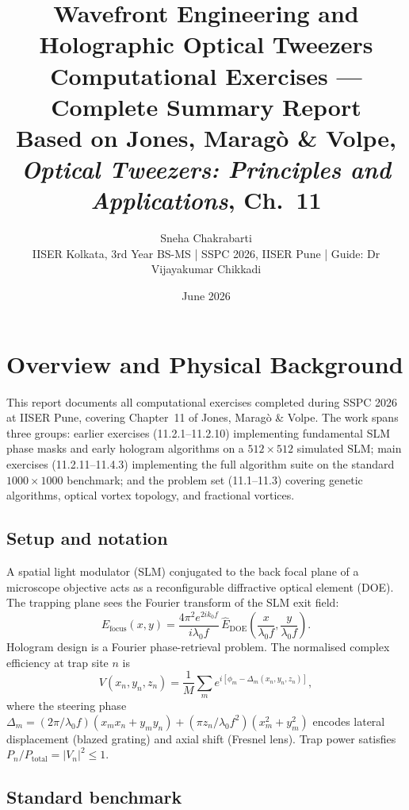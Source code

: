 \documentclass[11pt,a4paper]{article}
\title{\textbf{Wavefront Engineering and Holographic Optical Tweezers}\\
\large Computational Exercises --- Complete Summary Report\\[0.5em]
\normalsize Based on Jones, Maragò \& Volpe,
\textit{Optical Tweezers: Principles and Applications}, Ch.~11}
\author{Sneha Chakrabarti\\
\small IISER Kolkata, 3rd Year BS-MS \quad|\quad
SSPC 2026, IISER Pune \quad|\quad
Guide: Dr Vijayakumar Chikkadi}
\date{June 2026}
\begin{document}
\maketitle
\tableofcontents
\newpage

\section{Overview and Physical Background}

This report documents all computational exercises completed during SSPC 2026
at IISER Pune, covering Chapter~11 of Jones, Maragò \& Volpe.
The work spans three groups: earlier exercises (11.2.1--11.2.10) implementing
fundamental SLM phase masks and early hologram algorithms on a $512\times512$
simulated SLM; main exercises (11.2.11--11.4.3) implementing the full algorithm
suite on the standard $1000\times1000$ benchmark; and the problem set
(11.1--11.3) covering genetic algorithms, optical vortex topology,
and fractional vortices.

\subsection{Setup and notation}

A spatial light modulator (SLM) conjugated to the back focal plane of a
microscope objective acts as a reconfigurable diffractive optical element (DOE).
The trapping plane sees the Fourier transform of the SLM exit field:
\begin{equation}
  E_\text{focus}(x,y)
  = \frac{4\pi^2 e^{2ik_0 f}}{i\lambda_0 f}
    \,\hat{E}_\text{DOE}\!\left(\frac{x}{\lambda_0 f},\frac{y}{\lambda_0 f}\right).
\end{equation}
Hologram design is a Fourier phase-retrieval problem. The normalised complex
efficiency at trap site $n$ is
\begin{equation}
  V(x_n,y_n,z_n) = \frac{1}{M}\sum_{m} e^{i[\phi_m - \Delta_m(x_n,y_n,z_n)]},
\end{equation}
where the steering phase
$\Delta_m = (2\pi/\lambda_0 f)(x_m x_n + y_m y_n) + (\pi z_n/\lambda_0 f^2)(x_m^2+y_m^2)$
encodes lateral displacement (blazed grating) and axial shift (Fresnel lens).
Trap power satisfies $P_n/P_\text{total} = |V_n|^2 \leq 1$.

\subsection{Standard benchmark}
\end{document}
